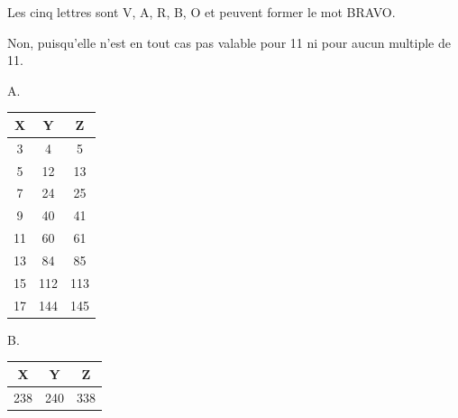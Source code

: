 \vspace{20pt}
\vspace{-10pt}Les cinq lettres sont V, A, R, B, O et peuvent former le mot BRAVO.

\vspace{20pt}
\vspace{-10pt}Non, puisqu'elle n'est en tout cas pas valable pour 11 ni pour aucun multiple de 11.

\vspace{20pt}
\vspace{-10pt}\begin{minipage}[t]{0.48\textwidth}
A.\vspace{2pt}

\begin{tabular}{ccc}
X & Y & Z \\
\hline
3 & 4 & 5 \\
5 & 12 & 13 \\
7 & 24 & 25 \\
9 & 40 & 41 \\
11 & 60 & 61 \\
13 & 84 & 85 \\
15 & 112 & 113 \\
17 & 144 & 145 \\
\end{tabular}
\end{minipage}%
\begin{minipage}[t]{0.48\textwidth}
B.\vspace{2pt}

\begin{tabular}{ccc}
X & Y & Z \\
\hline
238 & 240 & 338 \\
\end{tabular}
\end{minipage}

